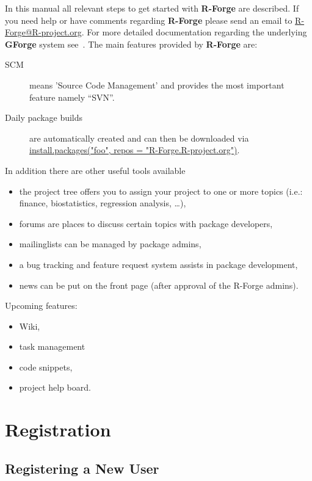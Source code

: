 \documentclass[a4paper]{article}
\begin{document}
In this manual all relevant steps to get
started with \textbf{R-Forge} are described. If you need help or have
comments regarding \textbf{R-Forge} please send an email to
\url{R-Forge@R-project.org}. For more detailed
documentation regarding the underlying \textbf{GForge} system
see~\cite{manual:gforge}.\newline 
\newline
The main features provided by \textbf{R-Forge} are:
\begin{description}
\item[SCM] means 'Source Code Management' and provides the most
  important feature namely ``SVN''.
\item[Daily package builds] are automatically created and can then be
  downloaded via\newline 
  \url{install.packages("foo", repos = "R-Forge.R-project.org")}.
\end{description}
In addition there are other useful tools available
\begin{itemize}
\item the project tree offers you to assign your project to one or more
  topics (i.e.: finance, biostatistics, regression analysis, \ldots),
\item forums are places to discuss certain topics with package
  developers,
\item mailinglists can be managed by package admins,
\item a bug tracking and feature request system assists in package
  development,
\item news can be put on the front page (after approval of the R-Forge
  admins).
\end{itemize}
Upcoming features:
\begin{itemize}
\item Wiki,
\item task management
\item code snippets,
\item project help board.
\end{itemize}

\section{Registration}
\label{sec:registration}

\subsection{Registering a  New User}
\end{document}
